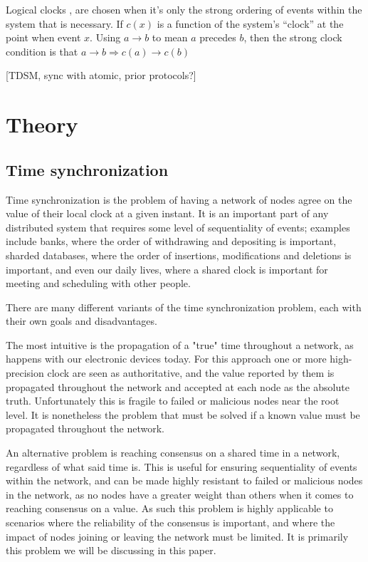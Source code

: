 \documentclass[a4paper,12pt]{article}
\begin{document}
Logical clocks \cite{Lamport78}, are chosen when it's only the strong
ordering of events within the system that is necessary.  If $c(x)$ is
a function of the system's ``clock'' at the point when event $x$.  Using
$a \rightarrow b$ to mean $a$ precedes $b$, then the strong clock condition is that
$a \rightarrow b \Rightarrow c(a) \rightarrow c(b)$

[TDSM, sync with atomic, prior protocols?]

\section{Theory}

\subsection{Time synchronization}


Time synchronization is the problem of having a network of nodes agree on the value of their local clock at a given instant. It is an important part of any distributed system that requires some level of sequentiality of events; examples include banks, where the order of withdrawing and depositing is important, sharded databases, where the order of insertions, modifications and deletions is important, and even our daily lives, where a shared clock is important for meeting and scheduling with other people.

There are many different variants of the time synchronization problem, each with their own goals and disadvantages.

The most intuitive is the propagation of a "true" time throughout a network, as happens with our electronic devices today. For this approach one or more high-precision clock are seen as authoritative, and the value reported by them is propagated throughout the network and accepted at each node as the absolute truth. Unfortunately this is fragile to failed or malicious nodes near the root level. It is nonetheless the problem that must be solved if a known value must be propagated throughout the network.

An alternative problem is reaching consensus on a shared time in a network, regardless of what said time is. This is useful for ensuring sequentiality of events within the network, and can be made highly resistant to failed or malicious nodes in the network, as no nodes have a greater weight than others when it comes to reaching consensus on a value. As such this problem is highly applicable to scenarios where the reliability of the consensus is important, and where the impact of nodes joining or leaving the network must be limited. It is primarily this problem we will be discussing in this paper.
\end{document}
